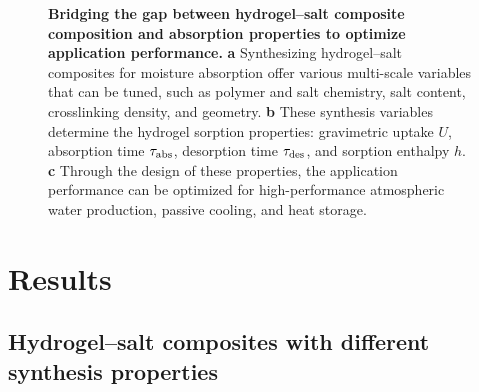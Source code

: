 \documentclass[11pt]{article}
\begin{document}
\begin{figure}[t]
\centering
{}
\caption{\textbf{Bridging the gap between hydrogel--salt composite composition and absorption properties to optimize application performance.} \textbf{a} Synthesizing hydrogel--salt composites for moisture absorption offer various multi-scale variables that can be tuned, such as polymer and salt chemistry, salt content, crosslinking density, and geometry. \textbf{b} These synthesis variables determine the hydrogel sorption properties: gravimetric uptake $U$, absorption time $\tau_{\rm abs}$, desorption time $\tau_{\rm des}$, and sorption enthalpy $h$. \textbf{c} Through the design of these properties, the application performance can be optimized for high-performance atmospheric water production, passive cooling, and heat storage.}
\label{fig:fig1}
\end{figure}

\section{Results}

\subsection{Hydrogel--salt composites with different synthesis properties}
\end{document}
